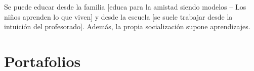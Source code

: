 \documentclass[palatino]{apuntesURJC}
\begin{document}
Se puede educar desde la familia [educa para la amistad siendo modelos -- Los niños aprenden lo que viven]  y desde la escuela [se suele trabajar desde la intuición del profesorado].
%
Además, la propia socialización supone aprendizajes.



\appendix



\chapter{Portafolios}



\printindex
\end{document}

